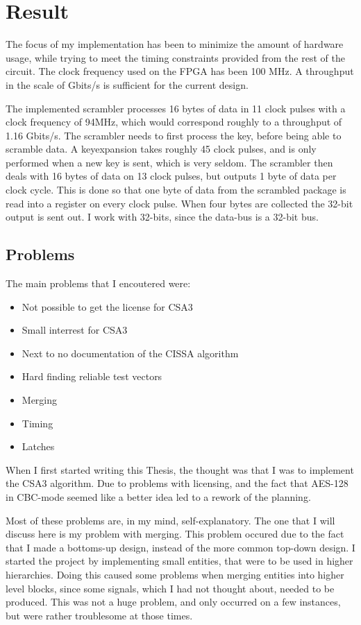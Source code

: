 \chapter{Result}
The focus of my implementation has been to minimize the amount of 
hardware usage, while trying to meet the timing constraints provided 
from the rest of the circuit. The clock frequency used on the FPGA has 
been 100 MHz. A throughput in the scale of Gbits/s is sufficient for the
current design.

The implemented scrambler processes 16 bytes of data in 11 clock pulses 
with a clock frequency of 94MHz, which would correspond 
roughly to a throughput of 1.16 Gbits/s. The scrambler needs to first
process the key, before being able to scramble data. A keyexpansion 
takes roughly 45 clock pulses, and is only performed when a new key is 
sent, which is very seldom. The scrambler then deals with 16 bytes of 
data on 13 clock pulses, but outputs 1 byte of data per clock cycle. 
This is done so that one byte of data from the scrambled package is 
read into a register on every clock pulse. When four bytes are collected
the 32-bit output is sent out. I work with 32-bits, since the data-bus 
is a 32-bit bus.

\section{Problems}
The main problems that I encoutered were:

\begin{itemize}
\item Not possible to get the license for CSA3
\item Small interrest for CSA3
\item Next to no documentation of the CISSA algorithm
\item Hard finding reliable test vectors
\item Merging
\item Timing
\item Latches
\end{itemize}

When I first started writing this Thesis, the thought was that I was to 
implement the CSA3 algorithm. Due to problems with licensing, and the 
fact that AES-128 in CBC-mode seemed like a better idea led to a rework 
of the planning.

Most of these problems are, in my mind, self-explanatory. The one that 
I will discuss here is my problem with merging. This problem occured 
due to the fact that I made a bottoms-up design, instead of the more 
common top-down design. I started the project by implementing small 
entities, that were to be used in higher hierarchies. Doing this caused 
some problems when merging entities into higher level blocks, since 
some signals, which I had not thought about, needed to be produced. 
This was not a huge problem, and only occurred on a few instances, but 
were rather troublesome at those times.

